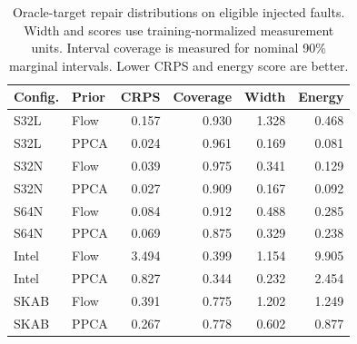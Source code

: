 \begin{table}[t]
\centering
\caption{Oracle-target repair distributions on eligible injected faults. Width and scores use training-normalized measurement units. Interval coverage is measured for nominal 90\% marginal intervals. Lower CRPS and energy score are better.}
\label{tab:repair}
\small
\begin{tabular}{llrrrr}
\toprule
Config. & Prior & CRPS & Coverage & Width & Energy \\
\midrule
S32L & Flow & 0.157 & 0.930 & 1.328 & 0.468 \\
S32L & PPCA & 0.024 & 0.961 & 0.169 & 0.081 \\
S32N & Flow & 0.039 & 0.975 & 0.341 & 0.129 \\
S32N & PPCA & 0.027 & 0.909 & 0.167 & 0.092 \\
S64N & Flow & 0.084 & 0.912 & 0.488 & 0.285 \\
S64N & PPCA & 0.069 & 0.875 & 0.329 & 0.238 \\
Intel & Flow & 3.494 & 0.399 & 1.154 & 9.905 \\
Intel & PPCA & 0.827 & 0.344 & 0.232 & 2.454 \\
SKAB & Flow & 0.391 & 0.775 & 1.202 & 1.249 \\
SKAB & PPCA & 0.267 & 0.778 & 0.602 & 0.877 \\
\bottomrule
\end{tabular}
\end{table}
